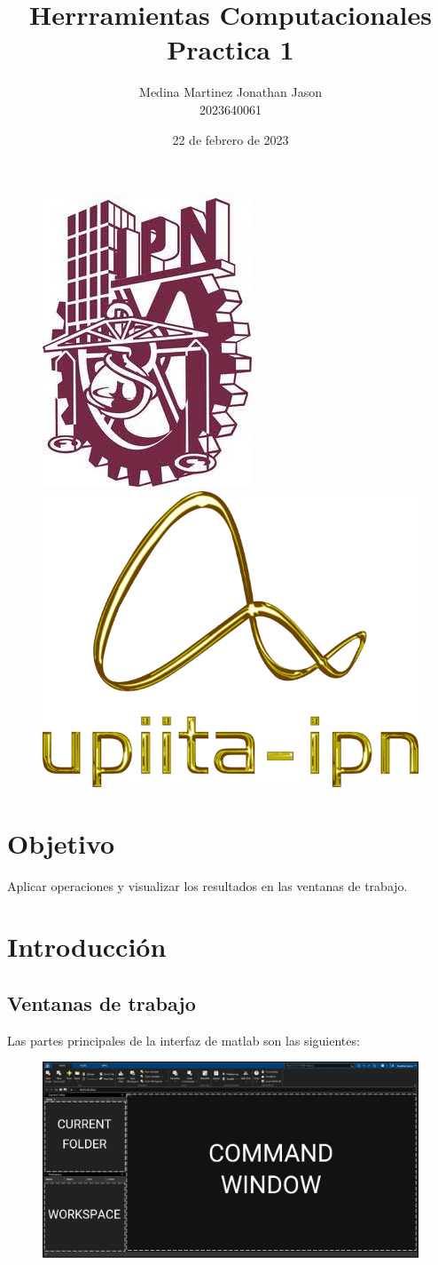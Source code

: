 \documentclass{article}
\title{Herrramientas Computacionales \\ Practica 1}
\author{Medina Martinez Jonathan Jason \\ 2023640061}
\date{22 de febrero de 2023}
\begin{document}

\fontsize{12}{14}\selectfont

\begin{figure}[t] %

\includegraphics[width=2.5 cm]{Logo1.jpeg}
\hfill
\includegraphics[width=3 cm]{Logo2.png}

\end{figure}

\maketitle %
\newpage

\tableofcontents %
\newpage

\section{Objetivo}

Aplicar operaciones y visualizar los resultados en las ventanas de trabajo.

\section{Introducción}

\subsection{Ventanas de trabajo}
Las partes principales de la interfaz de matlab son las siguientes:

\begin{figure}[H]
    \centering
    \includegraphics[width=18cm]{partes.jpg}
    \label{fig:my_label}
\end{figure}
\end{document}
